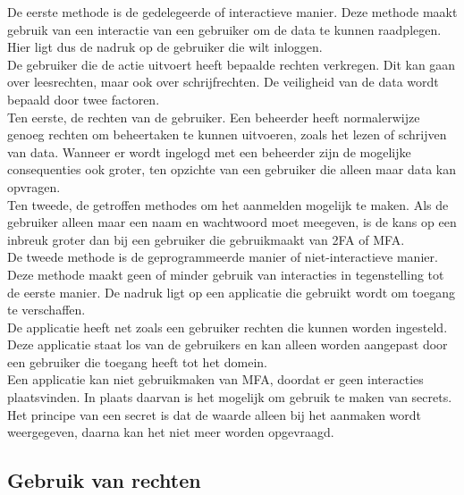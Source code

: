 
De eerste methode is de gedelegeerde of interactieve manier. Deze methode maakt gebruik van een interactie van een gebruiker om de data te kunnen raadplegen. Hier ligt dus de nadruk op de gebruiker die wilt inloggen. \\

De gebruiker die de actie uitvoert heeft bepaalde rechten verkregen. Dit kan gaan over leesrechten, maar ook over schrijfrechten. De veiligheid van de data wordt bepaald door twee factoren. \\

Ten eerste, de rechten van de gebruiker. Een beheerder heeft normalerwijze genoeg rechten om beheertaken te kunnen uitvoeren, zoals het lezen of schrijven van data. Wanneer er wordt ingelogd met een beheerder zijn de mogelijke consequenties ook groter, ten opzichte van een gebruiker die alleen maar data kan opvragen. \\ 

Ten tweede, de getroffen methodes om het aanmelden mogelijk te maken. Als de gebruiker alleen maar een naam en wachtwoord moet meegeven, is de kans op een inbreuk groter dan bij een gebruiker die gebruikmaakt van \ac{2FA} of \Ac{MFA}. \\

De tweede methode is de geprogrammeerde manier of niet-interactieve manier. Deze methode maakt geen of minder gebruik van interacties in tegenstelling tot de eerste manier. De nadruk ligt op een applicatie die gebruikt wordt om toegang te verschaffen. \\

De applicatie heeft net zoals een gebruiker rechten die kunnen worden ingesteld. Deze applicatie staat los van de gebruikers en kan alleen worden aangepast door een gebruiker die toegang heeft tot het domein. \\

Een applicatie kan niet gebruikmaken van \ac{MFA}, doordat er geen interacties plaatsvinden. In plaats daarvan is het mogelijk om gebruik te maken van secrets. Het principe van een secret is dat de waarde alleen bij het aanmaken wordt weergegeven, daarna kan het niet meer worden opgevraagd.

\subsection{Gebruik van rechten}



